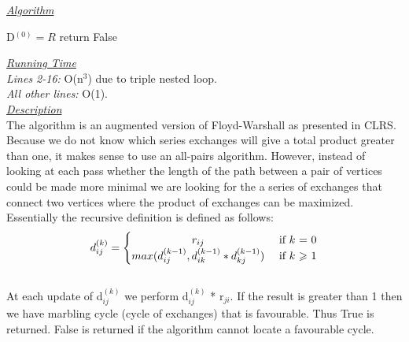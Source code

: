 \documentclass[10pt]{csc_assignment}
\begin{document}
\begin{description}
\emph{\underline{Algorithm}}\\
\begin{algorithm}[H]
 \LinesNumbered 
 D$^{(0)} = R$\;
 return False\;
\end{algorithm}
\emph{\underline{Running Time}}\\
\emph{Lines 2-16:} O(n$^{3}$) due to triple nested loop.\\
\emph{All other lines:} O(1).\\
\emph{\underline{Description}}\\
The algorithm is an augmented version of Floyd-Warshall as presented 
in CLRS. Because we do not know which series exchanges will give a 
total product greater than one, it makes sense to use an all-pairs
algorithm. However, instead of looking at each pass whether the
length of the path between a pair of vertices could be made more 
minimal we are looking for the a series of exchanges that connect
two vertices where the product of exchanges can be maximized.\\
Essentially the recursive definition is defined as follows:\\
\[
d_{ij}^{(k)} = 
\begin{cases} 
      \hfill r_{ij}    \hfill & \text{ if $k$ = 0} \\
      \hfill max(d_{ij}^{(k-1)}, d_{ik}^{(k-1)} * d_{kj}^{(k-1)})\hfill & \text{ if $k$ $\geqslant$ 1} \\
  \end{cases}
\]\\
At each update of d$_{ij}^{(k)}$ we perform d$_{ij}^{(k)}$ * r$_{ji}$. 
If the result is greater than 1 then we have marbling cycle (cycle
 of exchanges) that is favourable. Thus True is returned. 
 False is returned if the algorithm cannot locate a favourable
 cycle.\\


\end{description}
\end{document}
